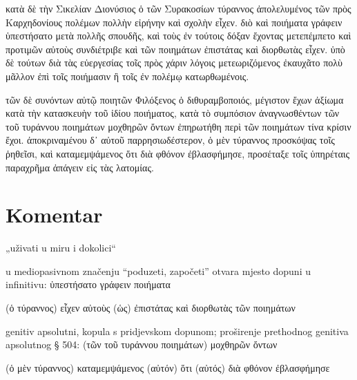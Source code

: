 {\large

\begin{greek}

\noindent κατὰ δὲ τὴν Σικελίαν Διονύσιος ὁ τῶν Συρακοσίων τύραννος ἀπολελυμένος τῶν πρὸς Καρχηδονίους πολέμων πολλὴν εἰρήνην καὶ σχολὴν εἶχεν. διὸ καὶ ποιήματα γράφειν ὑπεστήσατο μετὰ πολλῆς σπουδῆς, καὶ τοὺς ἐν τούτοις δόξαν ἔχοντας μετεπέμπετο καὶ προτιμῶν αὐτοὺς συνδιέτριβε καὶ τῶν ποιημάτων ἐπιστάτας καὶ διορθωτὰς εἶχεν. ὑπὸ δὲ τούτων διὰ τὰς εὐεργεσίας τοῖς πρὸς χάριν λόγοις μετεωριζόμενος ἐκαυχᾶτο πολὺ μᾶλλον ἐπὶ τοῖς ποιήμασιν ἢ τοῖς ἐν πολέμῳ κατωρθωμένοις.

τῶν δὲ συνόντων αὐτῷ ποιητῶν Φιλόξενος ὁ διθυραμβοποιός, μέγιστον ἔχων ἀξίωμα κατὰ τὴν κατασκευὴν τοῦ ἰδίου ποιήματος, κατὰ τὸ συμπόσιον ἀναγνωσθέντων τῶν τοῦ τυράννου ποιημάτων μοχθηρῶν ὄντων ἐπηρωτήθη περὶ τῶν ποιημάτων τίνα κρίσιν ἔχοι. ἀποκριναμένου δ᾽ αὐτοῦ παρρησιωδέστερον, ὁ μὲν τύραννος προσκόψας τοῖς ῥηθεῖσι, καὶ καταμεμψάμενος ὅτι διὰ φθόνον ἐβλασφήμησε, προσέταξε τοῖς ὑπηρέταις παραχρῆμα ἀπάγειν εἰς τὰς λατομίας.

\end{greek}

}


\section*{Komentar}



\begin{description}[noitemsep]
\item[εἰρήνην καὶ σχολὴν εἶχεν] „uživati u miru i dokolici“

\end{description}


\begin{description}[noitemsep]
\item[ὑπεστήσατο] u mediopasivnom značenju ``poduzeti, započeti'' otvara mjesto dopuni u infinitivu: ὑπεστήσατο γράφειν ποιήματα
\item[εἶχεν] \textgreek[variant=ancient]{(ὁ τύραννος) εἶχεν αὐτοὺς (ὡς) ἐπιστάτας καὶ διορθωτὰς τῶν ποιημάτων}

\end{description}



\begin{description}[noitemsep]
\item[μοχθηρῶν ὄντων] genitiv apsolutni, kopula s pridjevskom dopunom; proširenje prethodnog genitiva apsolutnog § 504: \textgreek[variant=ancient]{(τῶν τοῦ τυράννου ποιημάτων) μοχθηρῶν ὄντων}
\end{description}



\begin{description}[noitemsep]
\item[ὅτι… ἐβλασφήμησε] \textgreek[variant=ancient]{(ὁ μὲν τύραννος) καταμεμψάμενος (αὐτόν) ὅτι (αὐτός) διὰ φθόνον ἐβλασφήμησε}
\end{description}



